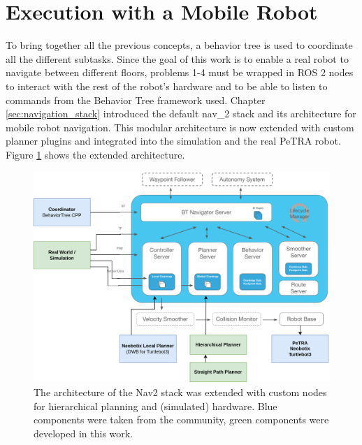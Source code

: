 \section{Execution with a Mobile Robot}
\label{sec:execution}
To bring together all the previous concepts, a behavior tree is used to coordinate all the different subtasks. Since the goal of this work is to enable a real robot to navigate between different floors, problems 1-4 must be wrapped in ROS 2 nodes to interact with the rest of the robot's hardware and to be able to listen to commands from the Behavior Tree framework used. Chapter \ref{sec:navigation_stack} introduced the default \gls{nav_2} stack and its architecture for mobile robot navigation. This modular architecture is now extended with custom planner plugins and integrated into the simulation and the real PeTRA robot. Figure \ref{fig:concept_nav2} shows the extended architecture. 

\begin{figure}[h]
    \centering
    \includegraphics[width=\textwidth]{figures/40_concept/concept_nav2.png}
    \caption[The architecture of the Nav2 stack extended with custom nodes for hierarchical planning and (simulated) hardware]{The architecture of the Nav2 stack was extended with custom nodes for hierarchical planning and (simulated) hardware. Blue components were taken from the community, green components were developed in this work.}
    \label{fig:concept_nav2}
\end{figure}

